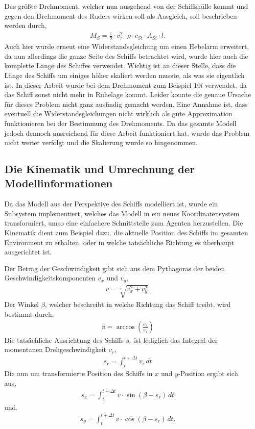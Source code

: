 \documentclass[]{iat}
\begin{document}
Das größte Drehmoment, welcher nun ausgehend von der Schiffshülle kommt und gegen den Drehmoment des Ruders wirken soll als Ausgleich, soll beschrieben werden durch,
\begin{align}
    M_S = \frac{1}{2} \cdot v_r^2 \cdot \rho \cdot c_{St} \cdot A_{St} \cdot l.
\end{align}
Auch hier wurde erneut eine Widerstandsgleichung um einen Hebelarm erweitert, da nun allerdings die ganze Seite des Schiffs betrachtet wird, wurde hier auch die komplette Länge des Schiffes verwendet. Wichtig ist an dieser Stelle, dass die Länge des Schiffs um einiges höher skaliert werden musste, als was sie eigentlich ist. In dieser Arbeit wurde bei dem Drehmoment zum Beispiel $10l$ verwendet, da das Schiff sonst nicht mehr in Ruhelage kommt. Leider konnte die genaue Ursache für dieses Problem nicht ganz ausfindig gemacht werden. Eine Annahme ist, dass eventuell die Widerstandsgleichungen nicht wirklich als gute Approximation funktionieren bei der Bestimmung des Drehmoments. Da das gesamte Modell jedoch dennoch ausreichend für diese Arbeit funktioniert hat, wurde das Problem nicht weiter verfolgt und die Skalierung wurde so hingenommen.

\subsection{Die Kinematik und Umrechnung der Modellinformationen} \label{sec:kinematik}
Da das Modell aus der Perspektive des Schiffs modelliert ist, wurde ein Subsystem implementiert, welches das Modell in ein neues Koordinatensystem transformiert, umso eine einfachere Schnittstelle zum Agenten herzustellen. Die Kinematik dient zum Beispiel dazu, die aktuelle Position des Schiffs im gesamten Environment zu erhalten, oder in welche tatsächliche Richtung es überhaupt ausgerichtet ist.

Der Betrag der Geschwindigkeit gibt sich aus dem Pythagoras der beiden Geschwindigkeitskomponenten $v_x$ und $v_y$,
\begin{align}
    v = \sqrt[2]{v_x^2 + v_y^2}.
\end{align}
Der Winkel $\beta$, welcher beschreibt in welche Richtung das Schiff treibt, wird bestimmt durch,
\begin{align}
    \beta = \arccos \left( \frac{v_x}{v_y} \right)
\end{align}
Die tatsächliche Ausrichtung des Schiffs $s_r$ ist lediglich das Integral der momentanen Drehgeschwindigkeit $v_r$,
\begin{align}
    s_r = \int_{t}^{t+\Delta t} v_r \, dt
\end{align}
Die nun um transformierte Position des Schiffs in $x$ und $y$-Position ergibt sich aus,
\begin{align}
    s_x = \int_{t}^{t+\Delta t} v \cdot \sin(\beta - s_r) \, dt
\end{align}
und,
\begin{align}
    s_y = \int_{t}^{t+\Delta t} v \cdot \cos(\beta - s_r) \, dt.
\end{align}
\end{document}
